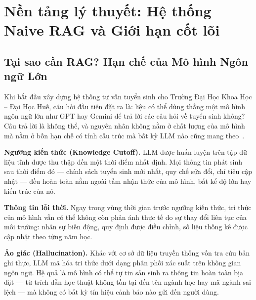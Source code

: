 \documentclass[12pt,a4paper]{report}
\theoremstyle{plain}
\theoremstyle{definition}
\begin{document}
	\clearpage
	

	\newcommand{\mainmatter}{}
	\pagenumbering{arabic}


	\chapter{Nền tảng lý thuyết: Hệ thống Naive RAG và Giới hạn cốt lõi}
	\label{chap:naive_rag}

	\section{Tại sao cần RAG? Hạn chế của Mô hình Ngôn ngữ Lớn}
	\label{sec:llm_limitations}

	Khi bắt đầu xây dựng hệ thống tư vấn tuyển sinh cho Trường Đại Học Khoa Học
	-- Đại Học Huế, câu hỏi đầu tiên đặt ra là: liệu có thể dùng thẳng một mô
	hình ngôn ngữ lớn như GPT hay Gemini để trả lời các câu hỏi về tuyển sinh
	không? Câu trả lời là không thể, và nguyên nhân không nằm ở chất lượng của
	mô hình mà nằm ở bốn hạn chế có tính cấu trúc mà bất kỳ LLM nào cũng mang
	theo~\cite{neo4j2024essential}.
	
	\textbf{Ngưỡng kiến thức (Knowledge Cutoff).} LLM được huấn luyện trên tập
	dữ liệu tĩnh được thu thập đến một thời điểm nhất định. Mọi thông tin phát
	sinh sau thời điểm đó --- chính sách tuyển sinh mới nhất, quy chế sửa đổi,
	chỉ tiêu cập nhật --- đều hoàn toàn nằm ngoài tầm nhận thức của mô hình, bất
	kể độ lớn hay kiến trúc của nó.
	
	\textbf{Thông tin lỗi thời.} Ngay trong vùng thời gian trước ngưỡng kiến thức,
	tri thức của mô hình vẫn có thể không còn phản ánh thực tế do sự thay đổi liên
	tục của môi trường: nhân sự biến động, quy định được điều chỉnh, số liệu thống
	kê được cập nhật theo từng năm học.
	
	\textbf{Ảo giác (Hallucination).} Khác với cơ sở dữ liệu truyền thống vốn tra
	cứu bản ghi thực, LLM mã hóa tri thức dưới dạng phân phối xác suất trên không
	gian ngôn ngữ. Hệ quả là mô hình có thể tự tin sản sinh ra thông tin hoàn toàn
	bịa đặt --- từ trích dẫn học thuật không tồn tại đến tên ngành học hay mã ngành
	sai lệch --- mà không có bất kỳ tín hiệu cảnh báo nào gửi đến người dùng.
	
\end{document}
